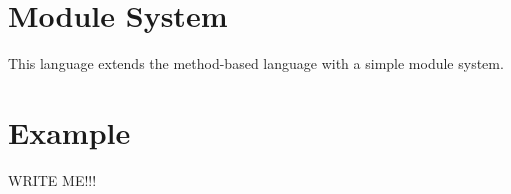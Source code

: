 \section{Module System}

This language extends the method-based language with a simple module system.





\section{Example}
WRITE ME!!!



